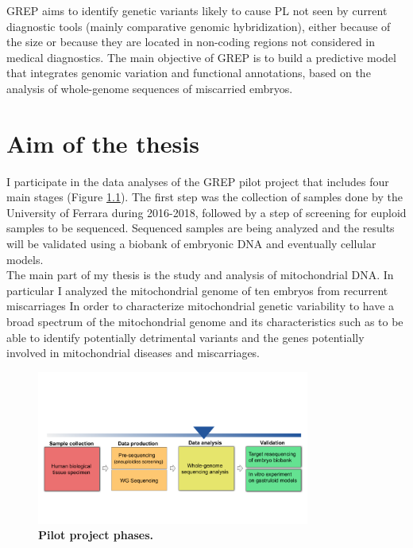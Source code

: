 GREP aims to identify genetic variants likely to cause PL not seen by current diagnostic tools (mainly comparative genomic hybridization), either because of the size or because they are located in non-coding regions not considered in medical diagnostics. The main objective of GREP is to build a predictive model that integrates genomic variation and functional annotations, based on the analysis of whole-genome sequences of miscarried embryos.\\

\chapter{Aim of the thesis }
I participate in the data analyses of the GREP pilot project that includes four main stages (Figure \ref{fig:projectPhases}). The first step was the collection of samples done by the University of Ferrara during 2016-2018, followed by a step of screening for euploid samples to be sequenced. Sequenced samples are being analyzed and the results will be validated using a biobank of embryonic DNA and eventually cellular models.\\

The main part of my thesis is the study and analysis of mitochondrial DNA. In particular I analyzed the mitochondrial genome of ten embryos from recurrent miscarriages In order to characterize mitochondrial genetic variability to have a broad spectrum of the mitochondrial genome and its characteristics such as to be able to identify potentially detrimental variants and the genes potentially involved in mitochondrial diseases and miscarriages.

\begin{figure}[H]
\centering
\includegraphics[width=0.80\textwidth]{Fig/projectPhases.png}
\decoRule
\caption{\textbf{Pilot project phases.}} 
\label{fig:projectPhases}
\end{figure}








